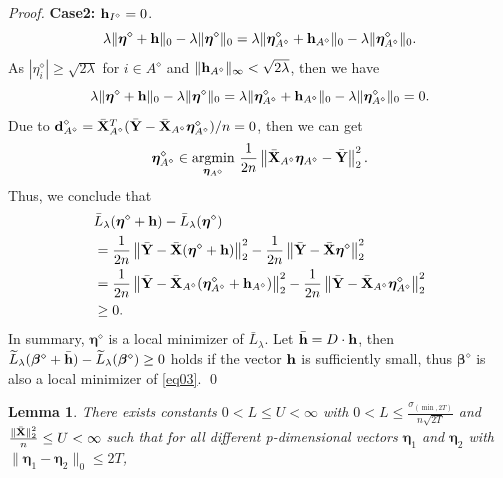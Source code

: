 \documentclass[12pt]{article}
\newtheorem{lemma}{Lemma}
\newcommand{\bX}{{\bf X}}
\newcommand{\bh}{\mbox{\bf h}}
\newcommand{\bd}{\mbox{\bf d}}
\newcommand{\bY}{\mbox{\bf Y}}
\newcommand{\bbeta}{\boldsymbol{\beta}}
\newcommand{\boldeta}{\boldsymbol{\eta}}
\begin{document}
\begin{appendix}
\begin{proof}
\textbf{Case2:} $\bh_{I^{\diamond}}=0$. \begin{equation*}
\lambda\|\boldeta^{\diamond}+\bh\|_{0}-\lambda\|\boldeta^{\diamond}\|_{0}=\lambda\|\boldeta_{A^\diamond}^{\diamond}+\bh_{A^\diamond}\|_{0}-\lambda\|\boldeta_{A^\diamond}^{\diamond}\|_{0}.
\end{equation*}
As $|\eta^{\diamond}_{i}|\geq\sqrt{2\lambda}$  for  $i\in{A^\diamond}$ and $\|\bh_{A^\diamond}\|_{\infty}<\sqrt{2\lambda}$, then we have \begin{equation*}
\lambda\|\boldeta^{\diamond}+\bh\|_{0}-\lambda\|\boldeta^{\diamond}\|_{0}=\lambda\|\boldeta_{A^\diamond}^{\diamond}+\bh_{A^\diamond}\|_{0}-\lambda\|\boldeta_{A^\diamond}^{\diamond}\|_{0}=0.
\end{equation*}
Due to $\bd^{\diamond}_{A^\diamond}=\bar{\bX}^{T}_{A^\diamond}(\bar{\bY}-\bar{\bX}_{A^\diamond}\boldeta^{\diamond}_{A^\diamond})/n=0$, then we can get
\begin{equation*}
\boldeta^{\diamond}_{A^\diamond}\in \underset{\boldeta_{A^\diamond}}{\mbox{argmin}}~\frac{1}{2n}\left\|\bar{\bX}_{A^\diamond}\boldeta_{A^\diamond}-\bar{\bY}\right\|_2^2.
\end{equation*}
Thus, we conclude that
\begin{equation*}
\begin{split}
&\bar{L}_{\lambda}(\boldeta^\diamond+\bh)-\bar{L}_{\lambda}(\boldeta^\diamond)\\
&=\frac{1}{2n}\left\|\bar{\bY}-\bar{\bX}(\boldeta^{\diamond}+\bh)\right\|_2^2-\frac{1}{2n}\left\|\bar{\bY}-\bar{\bX}\boldeta^{\diamond}\right\|_2^2\\
&=\frac{1}{2n}\left\|\bar{\bY}-\bar{\bX}_{A^\diamond}(\boldeta^{\diamond}_{A^\diamond}+\bh_{A^\diamond})\right\|_2^2-
\frac{1}{2n}\left\|\bar{\bY}-\bar{\bX}_{A^\diamond}\boldeta^{\diamond}_{A^\diamond}\right\|_2^2\\
&\geq0.
\end{split}
\end{equation*}
In summary, $\boldeta^{\diamond}$ is a local minimizer of $\bar{L}_{\lambda}$.
Let $\bar{\bh}=D\cdot \bh$,
then $\widetilde{L}_{\lambda}(\bbeta^\diamond+\bar{\bh})-\widetilde{L}_{\lambda}(\bbeta^\diamond)\geq0$ holds if the vector $\bh$  is sufficiently small, thus $\bbeta^\diamond$ is also a local
minimizer of \eqref{eq03}.
\qed
\end{proof}
\begin{lemma}\label{L9.0}
There exists  constants $0<L\leq U<\infty$ with $0<L\leq\frac{\sigma_{(\min,2T)}}{n\sqrt{2T}}$ and $\frac{\|\bar{\bX}\|_2^2}{n}\leq U<\infty$ such that for all different p-dimensional vectors $\boldeta_{1}$ and $\boldeta_{2}$ with $\|\boldeta_{1}-\boldeta_{2}\|_{0}\leq 2T$,

\end{lemma}
\end{appendix}
\end{document}
